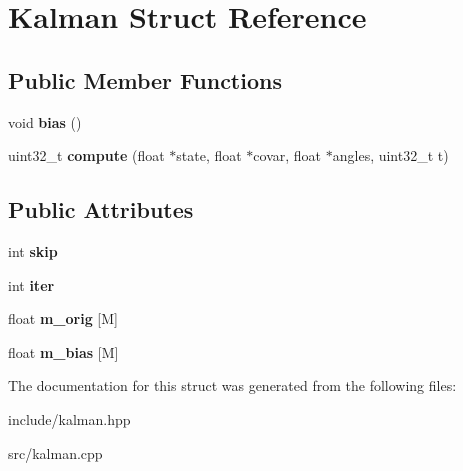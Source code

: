 \hypertarget{structKalman}{}\section{Kalman Struct Reference}
\label{structKalman}
\subsection*{Public Member Functions}
\begin{DoxyCompactItemize}
\item 
\mbox{\label{structKalman_a92d8a2bf6c725e8ad7da1015bbc41cdc}} 
void {\bfseries bias} ()
\item 
\mbox{\label{structKalman_ab314838fbb97199c19cd0fb48fffcfc4}} 
uint32\+\_\+t {\bfseries compute} (float $\ast$state, float $\ast$covar, float $\ast$angles, uint32\+\_\+t t)
\end{DoxyCompactItemize}
\subsection*{Public Attributes}
\begin{DoxyCompactItemize}
\item 
\mbox{\label{structKalman_a79ded01709506f54e5e2ef5d0b1c5ddf}} 
int {\bfseries skip}
\item 
\mbox{\label{structKalman_a98fa8a7387b5714f1f5d9d85a2555411}} 
int {\bfseries iter}
\item 
\mbox{\label{structKalman_a1672e563d4e6cc8f23b3fb4d1c546fe8}} 
float {\bfseries m\+\_\+orig} \mbox{[}M\mbox{]}
\item 
\mbox{\label{structKalman_ace399cd36d8df2e905562b5d0952d11f}} 
float {\bfseries m\+\_\+bias} \mbox{[}M\mbox{]}
\end{DoxyCompactItemize}


The documentation for this struct was generated from the following files\+:\begin{DoxyCompactItemize}
\item 
include/kalman.\+hpp\item 
src/kalman.\+cpp\end{DoxyCompactItemize}
